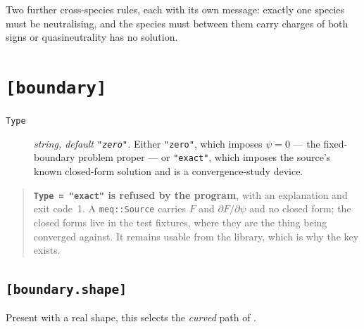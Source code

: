 Two further cross-species rules, each with its own message: exactly one species
must be neutralising, and the species must between them carry charges of both
signs or quasineutrality has no solution.

\section{\texttt{[boundary]}}

\begin{description}

\item[\texttt{Type}] \emph{string, default \texttt{"zero"}.} Either
	\texttt{"zero"}, which imposes $\psi = 0$ --- the fixed-boundary problem
	proper --- or \texttt{"exact"}, which imposes the source's known closed-form
	solution and is a convergence-study device.

\end{description}

\begin{quote}
	\textbf{\texttt{Type = "exact"} is refused by the program}, with an
	explanation and exit code~1. A \texttt{meq::Source} carries $F$ and
	$\partial F/\partial\psi$ and no closed form; the closed forms live in the
	test fixtures, where they are the thing being converged against. It remains
	usable from the library, which is why the key exists.
\end{quote}

\subsection{\texttt{[boundary.shape]}}

Present with a real shape, this selects the \emph{curved} path of
.

